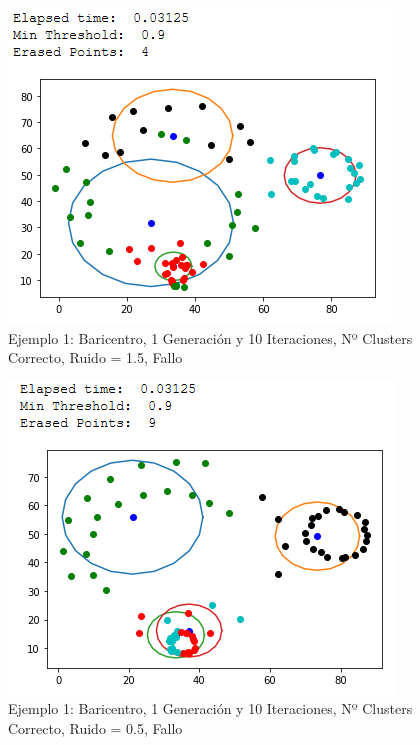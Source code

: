 \documentclass[conference,a4paper]{IEEEtran}
\begin{document}
\begin{figure}[H]
\centering
\includegraphics[scale=0.65]{Experimentacion/Ejemplo1/ej1_b_1_10_mr}
\caption{Ejemplo 1: Baricentro, 1 Generación y 10 Iteraciones,  Nº Clusters Correcto, Ruido = 1.5, Fallo\\}
\end{figure}

\begin{figure}[H]
\centering
\includegraphics[scale=0.65]{Experimentacion/Ejemplo1/ej1_b_1_10_lr}
\caption{Ejemplo 1: Baricentro, 1 Generación y 10 Iteraciones,  Nº Clusters Correcto, Ruido = 0.5, Fallo\\}
\end{figure}
\end{document}
